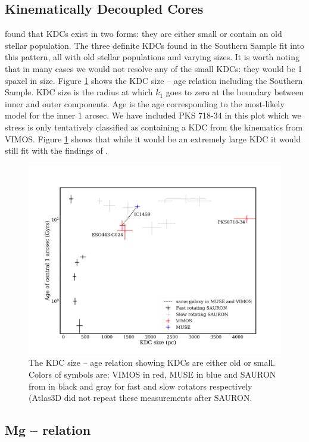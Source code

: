 {{{{	\subsection{Kinematically Decoupled Cores}
		\label{sec:popKDC}

		\citet{Kuntschner2010} found that KDCs exist in two forms: they are either small or contain an old stellar population. The three definite KDCs found in the Southern Sample fit into this pattern, all with old stellar populations and varying sizes. It is worth noting that in many cases we would not resolve any of the small KDCs: they would be 1 spaxel in size. Figure \ref{fig:KDC} shows the KDC size -- age relation including the Southern Sample. KDC size is the radius at which $k_1$ goes to zero at the boundary between inner and outer components. Age is the age corresponding to the most-likely model for the inner 1 arcsec. We have included PKS 718-34 in this plot which we stress is only tentatively classified as containing a KDC from the kinematics from VIMOS. Figure \ref{fig:KDC} shows that while it would be an extremely large KDC it would still fit with the findings of \citet{Kuntschner2010}.

		\begin{figure}
			\centering
			\includegraphics[width=.8\textwidth]{chapter4/KDC_size_age.png}
			\caption[KDC dichotomy]{The KDC size -- age relation showing KDCs are either old or small. Colors of symbols are: VIMOS in red, MUSE in blue and SAURON from \citet{Kuntschner2010} in black and gray for fast and slow rotators respectively (Atlas3D did not repeat these measurements after SAURON.}
			\label{fig:KDC}
		\end{figure}


	\subsection{Mg -- \textsigma relation}
		\label{subsec:Mgsigma}

}}}}
